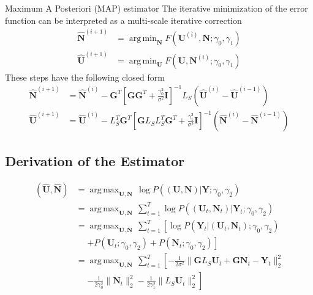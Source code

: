 \documentclass[progressbar=head]{beamer}
\newcommand{\ppar}[1]{ \left( #1 \right) }
\newcommand{\spar}[1]{ \left[ #1 \right] }
\DeclareMathOperator*{\argmax}{arg\,max}
\DeclareMathOperator*{\argmin}{arg\,min}
\newcommand{\nnorm}[1]{\lVert #1 \rVert}
\newcommand{\Y}{\mathbf{Y}}
\newcommand{\G}{\mathbf{G}}
\newcommand{\U}{\mathbf{U}}
\newcommand{\N}{\mathbf{N}}
\newcommand{\id}{\mathbf{I}}
\begin{document}
\begin{frame}{Maximum A Posteriori (MAP) estimator}
    The iterative minimization of the error function can be interpreted as a multi-scale iterative correction
    \begin{align}
        \hat{\N}^{(i+1)} &= \argmin_{\N} F\ppar{\U^{(i)},\N; \gamma_0, \gamma_1}
        \\
        \hat{\U}^{(i+1)} &= \argmin_{\U} F\ppar{\U,\N^{(i)}; \gamma_0, \gamma_1}
    \end{align}
    These steps have the following closed form
    \begin{align}
        \hat{\N}^{(i+1)} &=
        \hat{\N}^{(i)}
        -
        \G^T \spar{\G \G^T + \frac{\gamma_0^2}{\sigma^2} \id}^{-1} L_S \ppar{\hat{\U}^{(i)}-\hat{\U}^{(i-1)} }
        \\
        \hat{\U}^{(i+1)} &=
        \hat{\U}^{(i)}
        -
        L_S^T \G^T \spar{\G L_S L_S^T \G^T + \frac{\gamma_1^2}{\sigma^2} \id}^{-1} \ppar{\hat{\N}^{(i)}-\hat{\N}^{(i-1)} }
    \end{align}
\end{frame}

{
\subsection{Derivation of the Estimator}
}


\begin{frame}%
\begin{align*}
    \ppar{ \hat{\U}, \hat{\N} } &=
    \argmax_{\U, \N }\,
    \log P\ppar{\ppar{ {\U}, {\N} } \Big| {\Y; \gamma_0, \gamma_2} }
    \\
    &=
    \argmax_{\U, \N }\, \sum_{t=1}^T 
    \log P\ppar{\ppar{ {\U_t}, {\N_t} } \Big| {\Y_t; \gamma_0, \gamma_2} }
    \\
    &=
    \argmax_{\U, \N }\, \sum_{t=1}^T  \left[
    \log P\ppar{{ \Y_t } \Big| { \ppar{\U_t, \N_t}  ; \gamma_0, \gamma_2} }
    \right.
    \\
    &\phantom{=}
    \left.
    +
    P\ppar{{ {\U_t}  ; \gamma_0, \gamma_2} }
    +
    P\ppar{{ {\N_t}  ; \gamma_0, \gamma_2} }
    \right]
    \\
    &=
    \argmax_{\U, \N }\, \sum_{t=1}^T  \left[
    -\frac{1}{2\sigma^2}
    \nnorm{\G L_S \U_t + \G \N_t - \Y_t}_2^2
    \right.
    \\
    &\phantom{=}
    \left.
    -
    \frac{1}{2\gamma_0^2} \nnorm{\N_t}_2^2
    -
    \frac{1}{2\gamma_1^2} \nnorm{L_S \U_t}_2^2
    \right]
\end{align*}
\end{frame}
\end{document}
